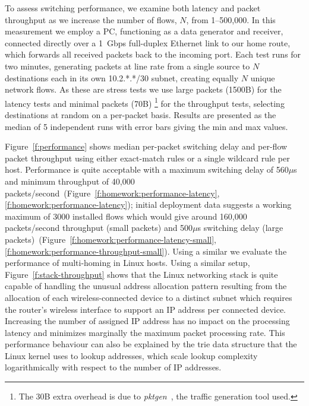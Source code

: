 To assess switching performance, we examine both latency and packet throughput
as we increase the number of flows, $N$, from 1--500,000. In this measurement we
employ a PC, functioning as a data generator and receiver, connected directly
over a 1~Gbps full-duplex Ethernet link to our home route, which forwards all
received packets back to the incoming port. 
Each test runs for two minutes, generating packets at line rate from a single
source to $N$ destinations each in its own 10.2.*.*/30 subnet, creating equally
$N$ unique network flows.  As these are stress tests we use large packets
(1500B) for the latency tests and minimal packets (70B) \footnote{The 30B extra
  overhead is due to \emph{pktgen}~\cite{olsson05:_linux_packet_gener}, the
  traffic generation tool used.} for the throughput tests, selecting
destinations at random on a per-packet basis.  Results are presented as the
median of 5 independent runs with error bars giving the min and max values. 

Figure~\ref{f:performance} shows median per-packet switching delay and per-flow
packet throughput using either exact-match rules or a single wildcard rule per
host. 
Performance is quite acceptable with a maximum switching delay of
560$\mu$s and minimum throughput of 40,000
packets/second~(Figure~\ref{f:homework:performance-latency},\ref{f:homework:performance-latency}); 
initial deployment
data suggests a working maximum of 3000 installed flows which would give around
160,000 packets/second throughput (small packets) and 500$\mu$s switching delay
(large
packets)~(Figure~\ref{f:homework:performance-latency-small},\ref{f:homework:performance-throughput-small}).  Using a similar we evaluate the performance of multi-homing in
Linux hosts. Using a similar setup, Figure~\ref{f:stack-throughput} shows that the Linux
networking stack is quite capable of handling the unusual address allocation
pattern resulting from the allocation of each wireless-connected device to a
distinct subnet which requires the router's wireless interface to support an IP
address per connected device. Increasing the number of assigned IP address has
no impact on the processing latency and minimizes marginally the maximum packet
processing rate. This performance behaviour can also be explained by the trie 
data structure that the Linux kernel uses to lookup addresses, which scale
lookup complexity logarithmically with respect to the number of IP addresses. 

